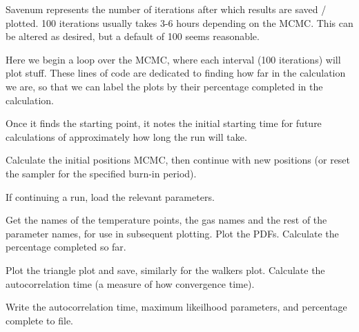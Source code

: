 \documentclass[11pt, a4paper,titlepage]{report}
\begin{document}


Savenum represents the number of iterations after which results are saved / plotted. 100 iterations usually takes 3-6 hours depending on the MCMC. This can be altered as desired, but a default of 100 seems reasonable.



Here we begin a loop over the MCMC, where each interval (100 iterations) will plot stuff. These lines of code are dedicated to finding how far in the calculation we are, so that we can label the plots by their percentage completed in the calculation.

Once it finds the starting point, it notes the initial starting time for future calculations of approximately how long the run will take. 



Calculate the initial positions MCMC, then continue with new positions (or reset the sampler for the specified burn-in period). 



If continuing a run, load the relevant parameters.



Get the names of the temperature points, the gas names and the rest of the parameter names, for use in subsequent plotting. Plot the PDFs. Calculate the percentage completed so far.



Plot the triangle plot and save, similarly for the walkers plot. Calculate the autocorrelation time (a measure of how convergence time). 



Write the autocorrelation time, maximum likeilhood parameters, and percentage complete to file.


\end{document}
